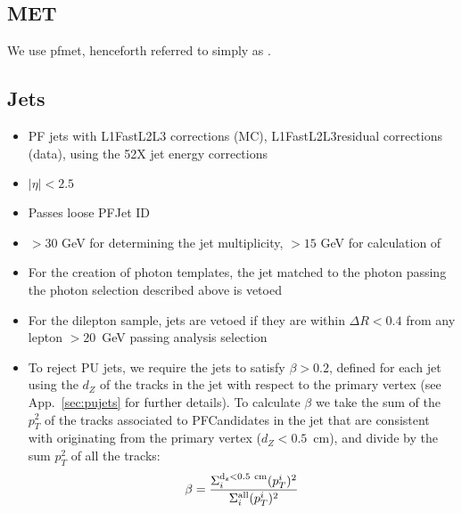 \subsection{MET}

We use pfmet, henceforth referred to simply as \MET.

\subsection{Jets}
\label{sec:jetsel}

\begin{itemize}
\item PF jets with L1FastL2L3 corrections (MC), L1FastL2L3residual corrections (data), using the 52X jet energy corrections
\item $|\eta| < 2.5$
\item Passes loose PFJet ID
\item \pt $ > 30$ GeV for determining the jet multiplicity, \pt $ > 15$ GeV for calculation of \Ht
\item For the creation of photon templates, the jet matched to the photon passing the photon selection described above is vetoed
\item For the dilepton sample, jets are vetoed if they are within $\Delta R < 0.4$ 
from any lepton \pt $ > 20$~GeV passing analysis selection
\item To reject PU jets, we require the jets to satisfy $\beta>0.2$, defined for each jet using the $d_Z$ of the tracks in the jet with
respect to the primary vertex (see App.~\ref{sec:pujets} for further details). 
To calculate $\beta$ we take the sum of the $p_{T}^{2}$ of the tracks associated to PFCandidates in the jet
that are consistent with originating from the primary vertex ($d_Z<0.5$~cm), and divide by the sum $p_{T}^{2}$ of all the tracks:
\begin{equation}
\beta = \frac{\Sigma_{i}^{\rm{d_z<0.5~cm}} (p_{T}^{i})^2}{\Sigma_{i}^{\rm{all}}  (p_{T}^{i})^2}
\end{equation}
\end{itemize}

